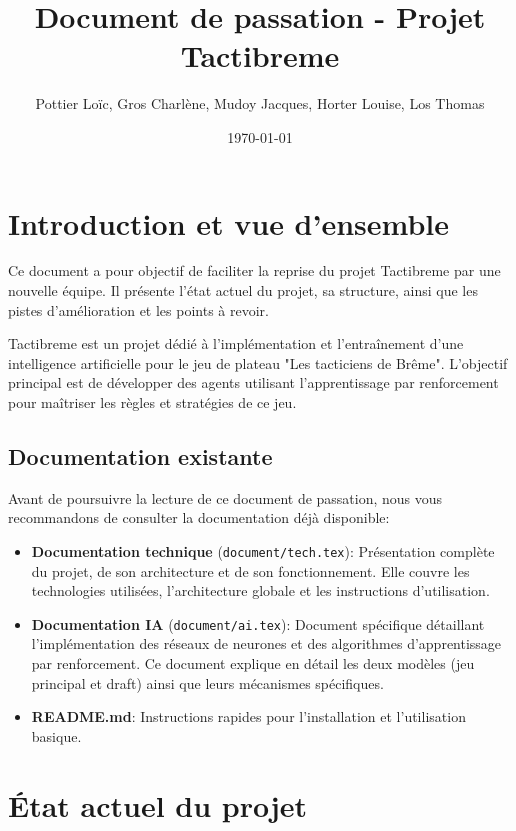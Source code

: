 \documentclass[]{article}
\title{\textbf{Document de passation - Projet Tactibreme}}
\author{Pottier Loïc, Gros Charlène, Mudoy Jacques, Horter Louise, Los Thomas}
\date{\today}
\begin{document}
\maketitle

\tableofcontents

\newpage

\section{Introduction et vue d'ensemble}

Ce document a pour objectif de faciliter la reprise du projet Tactibreme par une nouvelle équipe. Il présente l'état actuel du projet, sa structure, ainsi que les pistes d'amélioration et les points à revoir.

Tactibreme est un projet dédié à l'implémentation et l'entraînement d'une intelligence artificielle pour le jeu de plateau "Les tacticiens de Brême". L'objectif principal est de développer des agents utilisant l'apprentissage par renforcement pour maîtriser les règles et stratégies de ce jeu.

\subsection{Documentation existante}

Avant de poursuivre la lecture de ce document de passation, nous vous recommandons de consulter la documentation déjà disponible:

\begin{itemize}
  \item \textbf{Documentation technique} (\texttt{document/tech.tex}): Présentation complète du projet, de son architecture et de son fonctionnement. Elle couvre les technologies utilisées, l'architecture globale et les instructions d'utilisation.
  \item \textbf{Documentation IA} (\texttt{document/ai.tex}): Document spécifique détaillant l'implémentation des réseaux de neurones et des algorithmes d'apprentissage par renforcement. Ce document explique en détail les deux modèles (jeu principal et draft) ainsi que leurs mécanismes spécifiques.
  \item \textbf{README.md}: Instructions rapides pour l'installation et l'utilisation basique.
\end{itemize}

\section{État actuel du projet}
\end{document}

